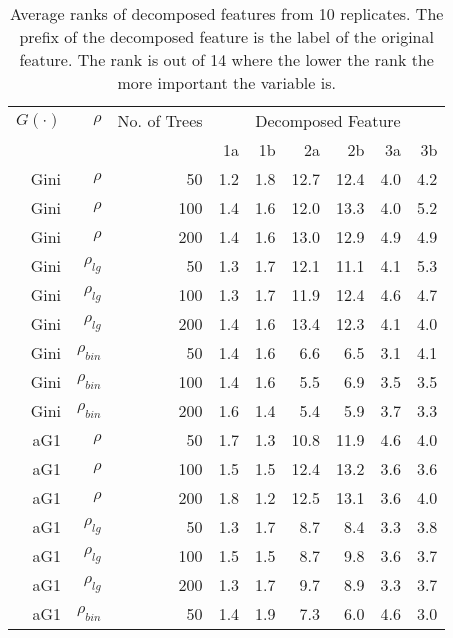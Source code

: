 \documentclass[twoside,11pt]{article}
\begin{document}
\begin{table}%
  \centering
  \caption{Average ranks of decomposed features from 10 replicates. The prefix of the decomposed feature is the label of the original feature. The rank is out of 14 where the lower the rank the more important the variable is.}
\begin{tabular}{rrrrrrrrr}
\hline
$G(\cdot)$ & $\rho$ & No. of Trees & \multicolumn{6}{c}{Decomposed Feature}\\
 &  &  &  1a &  1b &  2a &  2b &  3a &  3b \bigstrut\\
\hline
Gini     & $\rho$ & 50    & 1.2   & 1.8   & 12.7  & 12.4  & 4.0   & 4.2 \bigstrut[t]\\
Gini     & $\rho$ & 100   & 1.4   & 1.6   & 12.0  & 13.3  & 4.0   & 5.2 \\
Gini  & $\rho$ & 200   & 1.4   & 1.6   & 13.0  & 12.9  & 4.9   & 4.9 \bigstrut[b]\\
\hline
Gini     & $\rho_{lg}$ & 50    & 1.3   & 1.7   & 12.1  & 11.1  & 4.1   & 5.3 \bigstrut[t]\\
Gini     & $\rho_{lg}$ & 100   & 1.3   & 1.7   & 11.9  & 12.4  & 4.6   & 4.7 \\
Gini     & $\rho_{lg}$ & 200   & 1.4   & 1.6   & 13.4  & 12.3  & 4.1   & 4.0 \bigstrut[b]\\
\hline
Gini     & $\rho_{bin}$ & 50    & 1.4   & 1.6   & 6.6   & 6.5   & 3.1   & 4.1 \bigstrut[t]\\
Gini     & $\rho_{bin}$ & 100   & 1.4   & 1.6   & 5.5   & 6.9   & 3.5   & 3.5 \\
Gini     & $\rho_{bin}$ & 200   & 1.6   & 1.4   & 5.4   & 5.9   & 3.7   & 3.3 \bigstrut[b]\\
\hline
aG1   & $\rho$ & 50    & 1.7   & 1.3   & 10.8  & 11.9  & 4.6   & 4.0 \bigstrut[t]\\
aG1   & $\rho$ & 100   & 1.5   & 1.5   & 12.4  & 13.2  & 3.6   & 3.6 \\
aG1   & $\rho$ & 200   & 1.8   & 1.2   & 12.5  & 13.1  & 3.6   & 4.0 \bigstrut[b]\\
\hline
aG1   & $\rho_{lg}$ & 50    & 1.3   & 1.7   & 8.7   & 8.4   & 3.3   & 3.8 \bigstrut[t]\\
aG1   & $\rho_{lg}$ & 100   & 1.5   & 1.5   & 8.7   & 9.8   & 3.6   & 3.7 \\
aG1   & $\rho_{lg}$ & 200   & 1.3   & 1.7   & 9.7   & 8.9   & 3.3   & 3.7 \bigstrut[b]\\
\hline
aG1   & $\rho_{bin}$ & 50    & 1.4   & 1.9   & 7.3   & 6.0   & 4.6   & 3.0 \bigstrut[t]\\

\end{tabular}
\end{table}
\end{document}
